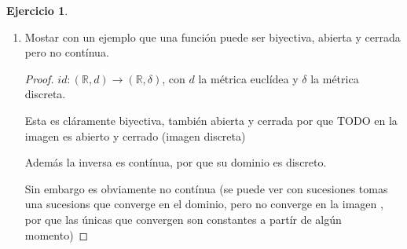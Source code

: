 \documentclass[11pt]{report}
\newcommand{\R}{\mathbb{R}}
\newcommand{\ra}{\rightarrow}
\theoremstyle{definition}
\newtheorem{ej}{Ejercicio}
\begin{document}
\begin{ej}
\begin{enumerate}
			\item Mostar con un ejemplo que una función puede ser biyectiva, abierta y cerrada pero no contínua.
				\begin{proof}
					$id: (\R,d) \ra (\R,\delta)$, con $d$ la métrica euclídea y $\delta$ la métrica discreta.

					Esta es cláramente biyectiva, también abierta y cerrada por que TODO en la imagen es abierto y cerrado (imagen discreta)

					Además la inversa es contínua, por que su dominio es discreto.

					Sin embargo es obviamente no contínua (se puede ver con sucesiones tomas una sucesions que converge en el dominio, pero no converge en la imagen , por que las únicas que convergen son constantes a partír de algún momento)



				\end{proof}
		\end{enumerate}
	\end{ej}
\end{document}
